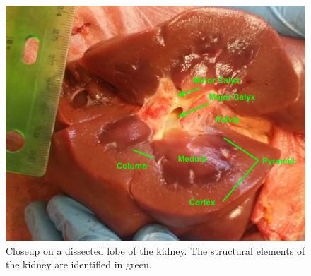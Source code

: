 \documentclass[12pt]{article}
\begin{document}
\begin{figure}[H]
	
	\centering	
	\includegraphics[width = 1\textwidth]{Figures/Kidney2.png}
	\caption{Closeup on a dissected lobe of the kidney. The structural elements of the kidney are identified in green.}
	\label{fig:K2}
\end{figure}
\end{document}
